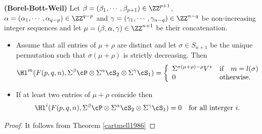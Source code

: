 \begin{theorem}{\bf (Borel-Bott-Weil)}
\label{bott2} Let $ \beta=(\beta_1, \cdots, \beta_{p+1}) \in \ZZ^{p+1}$, $\alpha=(\alpha_1, \cdots, \alpha_{q-p}) \in \ZZ^{q-p}$ and $\gamma=(\gamma_1, \cdots, \gamma_{n-q}) \in \ZZ^{n-q}$
 be non-increasing integer sequences  and let $\mu=(\beta,\alpha, \gamma) \in \ZZ^{n+1}$ be their concatenation.

\begin{itemize}
\item[(a)] Assume that all entries of $\mu + \rho $ are distinct and let $\sigma \in S_{n+1}$ be the unique permutation such
    that $\sigma(\mu+\rho)$ is strictly decreasing. Then
\[ \Hl^m(F(p,q,n), \Sigma^{\beta} \cP \otimes \Sigma^{\alpha} \cS_2 \otimes \Sigma^{\gamma}\cS_1)= \left \{ \begin{array}{ll}
\Sigma^{\sigma(\mu+\rho)-\rho} V^* & \mbox{if} \quad m=l(\sigma) \\
0 &\mbox{otherwise.}
 \end{array} \right. \]
\item[(b)] If at least two entries of $\mu + \rho $ coincide then $$
\Hl^{i}(F(p,q,n), \Sigma^{\beta} \cP \otimes \Sigma^{\alpha} \cS_2 \otimes \Sigma^{\gamma}\cS_1)= 0 \quad \mbox{for all interger } i.$$
\end{itemize}
\end{theorem}
\begin{proof} It follows from Theorem \ref{cartmell1986}
\end{proof}